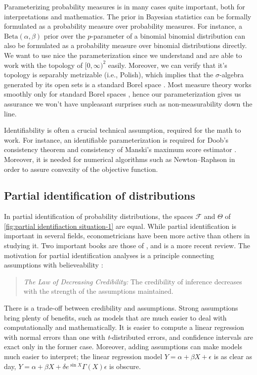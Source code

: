 Parameterizing probability measures is in many cases quite important, both for interpretations and mathematics. The prior in Bayesian statistics can be formally formulated as a probability measure over probability measures. For instance, a $\textrm{Beta}(\alpha,\beta)$ prior over the $p$-parameter of a binomial binomial distribution can also be formulated as a probability measure over binomial distributions directly. We want to use nice the parameterization since we understand and are able to work with the topology of $[0,\infty)^2$ easily. Moreover, we can verify that it's topology is separably metrizable (i.e., Polish), which implies that the $\sigma$-algebra generated by its open sets is a standard Borel space \parencite{Kechris2012-nh}. Most measure theory works smoothly only for standard Borel spaces \parencite[][Chapter 1]{Van_der_Vaart1996-dx}, hence our parameterization gives us assurance we won't have unpleasant surprises such as non-measurability down the line. 

Identifiability is often a crucial technical assumption, required for the math to work. For instance, an identifiable parameterization is required for Doob's consistency theorem \parencite{Miller2018-xq} and consistency of Manski's maximum score estimator \parencite{Manski1975-gl}. Moreover, it is needed for numerical algorithms such as Newton--Raphson in order to assure convexity of the objective function.

\subsection{Partial identification of distributions}
In partial identification of probability distributions, the spaces $\mathcal{F}$ and $\Theta$ of \ref{fig:partial identifiaction situation-1} are equal. While partial identification is important in several fields, econometricians have been more active than others in studying it. Two important books are those of \textcite{Manski1999-ab,Manski2003-aq}, and \textcite{Tamer2010-rj} is a more recent review. The motivation for partial identification analyses is a principle connecting assumptions with believeability \textcite[p. 1]{Manski2003-aq}:
\begin{quote}
\emph{The Law of Decreasing Credibility: }The credibility of inference
decreases with the strength of the assumptions maintained.
\end{quote}
There is a trade-off between credibility and assumptions. Strong assumptions bring plenty of benefits, such as models that are much easier to deal with computationally and mathematically. It is easier to compute a linear regression with normal errors than one with \emph{t}-distributed errors, and confidence intervals are exact only in the former case. Moreover, adding assumptions can make models much easier to interpret; the linear regression model $Y=\alpha+\beta X+\epsilon$ is as clear as day, $Y=\alpha+\beta X+\delta e^{\sin X}\Gamma(X)\epsilon$ is obscure. 

